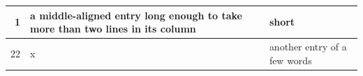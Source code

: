 \documentclass{article}
\begin{document}
{\small
\begin{tabularx}{\linewidth}{|r|X|X|}
\hline
1 & a middle-aligned entry long enough to take more than two lines in its column & short \\[3pt]
\hline
22 & x & another entry of a few words \\
\hline
\end{tabularx}\par}
\end{document}
